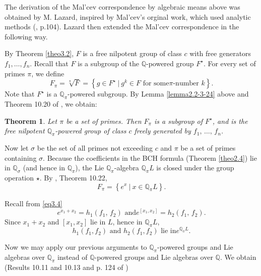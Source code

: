 \documentclass[mathscr]{amsart}
\theoremstyle{theorem}
\newtheorem{theorem}{Theorem}[section]
\theoremstyle{definition}
\numberwithin{equation}{section}
\def \({\left(}
\def \){\right)}
\def\Q{\mathbb{Q}}
\begin{document}
The derivation of the Mal'cev correspondence by algebraic means
above was obtained by M. Lazard, inspired by Mal'cev's orginal work,
which used analytic methods (\cite{Lazard}, p.104).  Lazard then
extended the Mal'cev correspondence in the following way.


By Theorem \ref{theo3.2}, $F$ is a free nilpotent group of class $c$
with free generators $f_1,\dots,f_n$.  Recall that $F$ is a subgroup
of the $\mathbb{Q}$-powered group $F^\star$.  For every set of
primes $\pi$, we define
$$
F_\pi=\sqrt[\pi]{F}=\left\{g\in F^\star\ |\ g^k\in F \text{ for some
}\pi\text{-number }k\right\}.
$$
Note that $F^\star$ is a $\Q_\pi$-powered subgroup. By Lemma
\ref{lemma2.2-3-24} above and Theorem 10.20 of \cite{Kh}, we obtain:

\begin{theorem}\label{theo3.5}
Let $\pi$ be a set of primes.  Then $F_\pi$ is a subgroup of
$F^\star$, and is the free nilpotent $\mathbb{Q}_\pi$-powered group
of class $c$ freely generated by $f_1,\,\dots,\,f_n$.
\end{theorem}

Now let $\sigma$ be the set of all primes not exceeding $c$ and
$\pi$ be a set of primes containing $\sigma$. Because the
coefficients in the BCH formula (Theorem \ref{theo2.4}) lie in
$\mathbb{Q}_\sigma$ (and hence in $\mathbb{Q}_\pi$), the Lie
$\mathbb{Q}_\pi$-algebra $\mathbb{Q}_\pi L$ is closed under the
group operation $\star$. By \cite{Kh}, Theorem 10.22,
\begin{equation}\label{eq4.4-3-28}
F_\pi=\left\{e^x\ |\ x\in\mathbb{Q}_\pi L\right\}.
\end{equation}

Recall from \eqref{eq3.4}
\begin{equation*}%
e^{x_1+x_2}=h_1\(f_1,\,f_2\)\text{ and
}e^{\left[x_1,x_2\right]}=h_2\(f_1,\,f_2\).
\end{equation*}
Since $x_1+x_2$ and $[x_1,x_2]$ lie in $L$, hence in $\mathbb{Q}_\pi
L$,
$$
h_1\(f_1,f_2\)\text{ and }h_2\(f_1,f_2\)\text{ lie in
}e^{\mathbb{Q}_\pi L}.
$$

Now we may apply our previous arguments to $\mathbb{Q}_\pi$-powered
groups and Lie algebras over $\mathbb{Q}_\pi$ instead of
$\mathbb{Q}$-powered groups and Lie algebras over $\mathbb{Q}$.  We
obtain (Results 10.11 and 10.13 and p. 124 of \cite{Kh})
\end{document}
